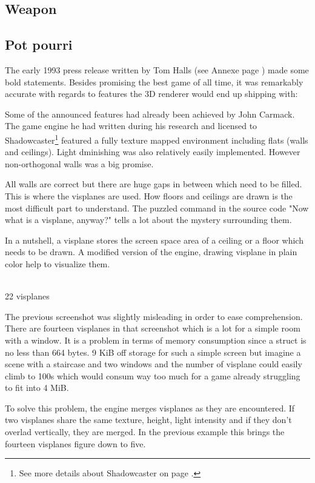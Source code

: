 \subsection{Weapon}

\subsection{Pot pourri}
The early 1993 press release written by Tom Halls (see Annexe page \pageref{label_press_release}) made some bold statements. Besides promising the best game of all time, it was remarkably accurate with regards to features the 3D renderer would end up shipping with:\\
\par
\par
Some of the announced features had already been achieved by John Carmack. The game engine he had written during his research and licensed to Shadowcaster\footnote{See more details about Shadowcaster on page \pageref{label_shadowcaster}.} featured a fully texture mapped environment including flats (walls and ceilings). Light dminishing was also relatively easily implemented. However non-orthogonal walls was a big promise.\\
\par

 All walls are correct but there are huge gaps in between which need to be filled. This is where the visplanes are used. How floors and ceilings are drawn is the most difficult part to understand. The puzzled command in the source code "Now what is a visplane, anyway?" tells a lot about the mystery surrounding them.\\
\par

In a nutshell, a visplane stores the screen space area of a ceiling or a floor which needs to be drawn. A modified version of the engine, drawing visplane in plain color help to visualize them.\\
\par
{}\\
 22 visplanes
\par
The previous screenshot was slightly misleading in order to ease comprehension. There are fourteen visplanes in that screenshot which is a lot for a simple room with a window. It is a problem in terms of memory consumption since a  struct is no less than 664 bytes. 9 KiB off storage for such a simple screen but imagine a scene with a staircase and two windows and the number of visplane could easily climb to 100s which would consum way too much for a game already struggling to fit into 4 MiB.\\
\par
To solve this problem, the engine merges visplanes as they are encountered. If two visplanes share the same texture, height, light intensity and if they don't overlad vertically, they are merged. In the previous example this brings the fourteen visplanes figure down to five.\\
\par
{}

